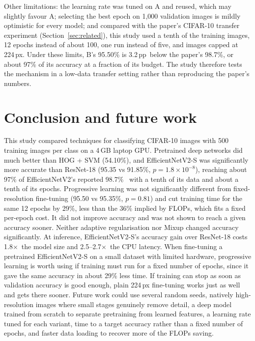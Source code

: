 \documentclass{COMPXXXX}
\newcommand{\pp}{\,pp}
\newcommand{\sx}{$\times$}
\begin{document}
Other limitations: the learning rate was tuned on A and reused, which may slightly favour A; selecting
the best epoch on 1{,}000 validation images is mildly optimistic for every model; and compared with
the paper's CIFAR-10 transfer experiment (Section~\ref{sec:related}), this study used a tenth of the
training images, 12 epochs instead of about 100, one run instead of five, and images capped at
224\,px. Under these limits, B's 95.50\% is 3.2\pp\ below the paper's 98.7\%, or about 97\% of its
accuracy at a fraction of its budget. The study therefore tests the mechanism in a low-data transfer
setting rather than reproducing the paper's numbers.

\section{Conclusion and future work}
This study compared techniques for classifying CIFAR-10 images with 500 training images per class on a
4\,GB laptop GPU. Pretrained deep networks did much better than HOG + SVM (54.10\%), and
EfficientNetV2-S was significantly more accurate than ResNet-18 (95.35 vs 91.85\%,
$p=1.8{\times}10^{-8}$), reaching about 97\% of EfficientNetV2's reported
98.7\%~\cite{tan2021efficientnetv2} with a tenth of its data and about a tenth of its epochs.
Progressive learning was not significantly different from fixed-resolution fine-tuning (95.50 vs
95.35\%, $p=0.81$) and cut training time for the same 12 epochs by 29\%, less than the 36\% implied by
FLOPs, which fits a fixed per-epoch cost. It did not improve accuracy and was not shown to reach a
given accuracy sooner. Neither adaptive regularisation nor Mixup changed accuracy significantly. At
inference, EfficientNetV2-S's accuracy gain over ResNet-18 costs 1.8\sx\ the model size and
2.5--2.7\sx\ the CPU latency.
When fine-tuning a pretrained EfficientNetV2-S on a small dataset with limited hardware, progressive
learning is worth using if training must run for a fixed number of epochs, since it gave the same
accuracy in about 29\% less time. If training can stop as soon as validation accuracy is good enough,
plain 224\,px fine-tuning works just as well and gets there sooner.
Future work could use several random seeds, natively high-resolution images where small stages
genuinely remove detail, a deep model trained from scratch to separate pretraining from learned
features, a learning rate tuned for each variant, time to a target accuracy rather than a fixed
number of epochs, and faster data loading to recover more of the FLOPs saving.
\end{document}
